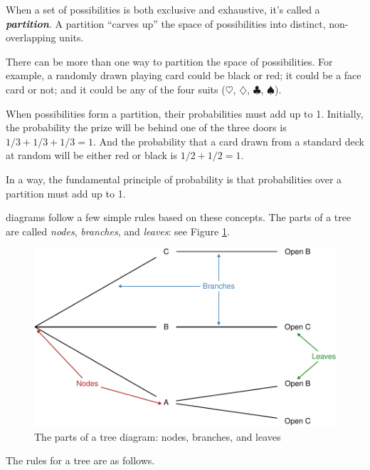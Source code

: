 \documentclass[justified]{tufte-book}
\theoremstyle{definition}
\theoremstyle{definition}
\theoremstyle{definition}
\theoremstyle{definition}
\theoremstyle{remark}
\begin{document}
When a set of possibilities is both exclusive and exhaustive, it's called a \textbf{\emph{partition}}. A partition ``carves up'' the space of possibilities into distinct, non-overlapping units.

There can be more than one way to partition the space of possibilities. For example, a randomly drawn playing card could be black or red; it could be a face card or not; and it could be any of the four suits (\(\heartsuit\), \(\diamondsuit\), \(\clubsuit\), \(\spadesuit\)).

When possibilities form a partition, their probabilities must add up to 1. Initially, the probability the prize will be behind one of the three doors is \(1/3 + 1/3 + 1/3 = 1\). And the probability that a card drawn from a standard deck at random will be either red or black is \(1/2 + 1/2 = 1\).

In a way, the fundamental principle of probability is that probabilities over a partition must add up to 1.

 diagrams follow a few simple rules based on these concepts. The parts of a tree are called \emph{nodes}, \emph{branches}, and \emph{leaves}: see Figure \ref{fig:treeparts}.

\begin{figure}
\includegraphics{_main_files/figure-latex/treeparts-1} \caption[The parts of a tree diagram]{The parts of a tree diagram: nodes, branches, and leaves}\label{fig:treeparts}
\end{figure}

The rules for a tree are as follows.
\end{document}
